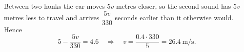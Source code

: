 Between two honks the car moves $5v$ metres closer, so the second sound has $5v$ metres less to travel and arrives $\dfrac{5v}{330}$ seconds earlier than it otherwise would. Hence
\[5-\dfrac{5v}{330}=4.6\quad\Longrightarrow\quad v=\dfrac{0.4\cdot330}{5}=\boxed{26.4\ \text{m/s}}.\]
